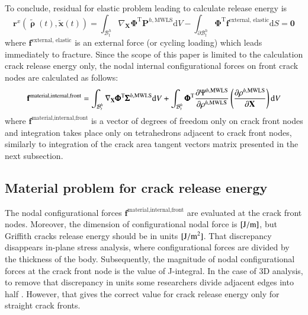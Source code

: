 \documentclass[11pt]{acmeArticle}
\numberwithin{equation}{section}
\begin{document}
To conclude, residual for elastic problem leading to calculate release 
energy is
\begin{equation}
	\mathbf{r}^x(\tilde{\pmb\uprho}(t), \tilde{\mathbf{x}}(t)) =
	\int_{\mathcal{B}^h_t} \nabla_\mathbf{X} \pmb{\Phi}^\textrm{T}
	\mathbf{P}^{h,\textrm{MWLS}}\textrm{d}V
	-
	\int_{\partial\mathcal{B}^h_t} \pmb{\Phi}^\textrm{T}
	\mathbf{f}^\textrm{external, elastic}
	\textrm{d}S	
	= \mathbf{0}
\end{equation}
where $\mathbf{f}^\textrm{external, elastic}$ is an external force (or cycling loading) which leads 
immediately to fracture. %
Since the scope of this paper is limited to the calculation crack release
energy only, the nodal internal configurational forces on front crack nodes are
calculated as follows:
\begin{equation}
	\mathbf{f}^\textrm{material,internal,front} = 
	\int_{\mathcal{B}^h_t}
		\nabla_\mathbf{X}\pmb{\Phi}^\textrm{T} {\pmb\Sigma}^{h,\textrm{MWLS}}
	\textrm{d}V
	+
	\int_{\mathcal{B}^h_t}
		\pmb{\Phi}^\textrm{T} \dfrac{\partial {\Psi}^{h,\textrm{MWLS}} }{\partial \rho^{h,\rm{MWLS}}}
		\left(
			\frac{\partial 
			\rho^{h,\textrm{MWLS}}}{\partial \mathbf{X}}
		\right)
	\textrm{d}V
	\label{eq:mat_int_front}
\end{equation}
where $\mathbf{f}^\textrm{material,internal,front}$ is a vector of degrees of
freedom only on crack front nodes and integration takes place only on
tetrahedrons adjacent to crack front nodes, similarly to integration of the crack
area tangent vectors matrix presented in the next subsection.

 \subsection{Material problem for crack release energy}

 The nodal configurational forces 
 $\mathbf{f}^\textrm{material,internal,front}$ are evaluated at
 the crack front nodes. Moreover, the dimension of configurational nodal force is
 $[\rm{J/m}]$, but Griffith cracks release energy should be in units $[{\rm{J/m}}^2]$.
 That discrepancy disappears in-plane stress analysis, where configurational
 forces are divided by the thickness of the body. Subsequently, the magnitude of
 nodal configurational forces at the crack front node is the value of J-integral. In the
 case of 3D analysis, to remove that discrepancy in units some researchers
 divide adjacent edges into half \citep{GuersesMiehe2009}. However, that gives the
 correct value for crack release energy only for straight crack fronts.
\end{document}
